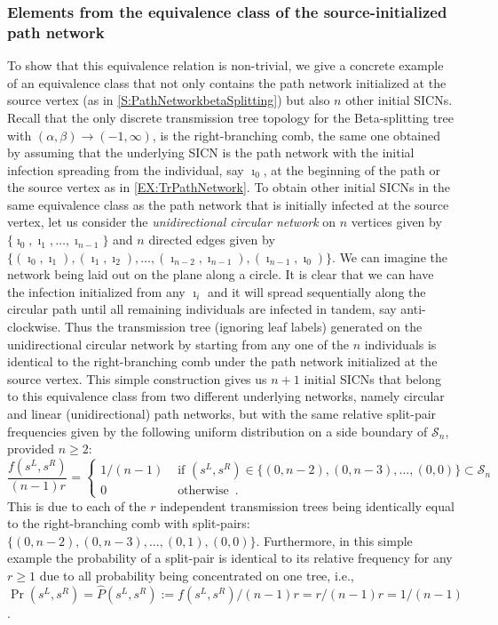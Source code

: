 \documentclass[review]{elsarticle}
\numberwithin{equation}{section}
\let\orgautoref\autoref
\renewcommand{\autoref}
        {\def\equationautorefname{Eq.}%
         \def\figureautorefname{Fig.}%
         \def\subfigureautorefname{Fig.}%
         \def\sectionautorefname{Sect.}%
         \def\subsectionautorefname{Sect.}%
         \def\subsubsectionautorefname{Sect.}%
         \def\Itemautorefname{item}%
         \def\tableautorefname{Table}%
         \def\propositionautorefname{Prop.}%
         \def\corollaryautorefname{Corollary}%
         \def\theoremautorefname{Theorem}%
         \def\remarkautorefname{Remark}%
         \def\lemmaautorefname{Lemma}%
         \def\proofofautorefname{Proof}%
         \def\exampleautorefname{Example}%
         \orgautoref}
\begin{document}
\subsubsection{Elements from the equivalence class of the source-initialized path network}\label{S:UnidirectionalCircularNetwork}
To show that this equivalence relation is non-trivial, we give a concrete example of an equivalence class that not only contains the path network initialized at the source vertex (as in \autoref{S:PathNetworkbetaSplitting}) but also $n$ other initial SICNs.
Recall that the only discrete transmission tree topology for the Beta-splitting tree with $(\alpha,\beta) \to (-1,\infty)$, 
is the right-branching comb, the same one obtained by assuming that the underlying SICN is the path network 
with the initial infection spreading from the individual, say $\imath_{0}$, at the beginning of the path or the source vertex as in \autoref{EX:TrPathNetwork}.   
To obtain other initial SICNs in the same equivalence class as the path network that is initially infected at the source vertex, let us consider the {\em unidirectional circular network} on $n$ vertices given by $\{\imath_0,\imath_1,\ldots,\imath_{n-1}\}$ and $n$ directed edges given by $\{(\imath_0,\imath_1), (\imath_1,\imath_2), \ldots, (\imath_{n-2},\imath_{n-1}), (\imath_{n-1},\imath_0)\}$.  We can imagine the network being laid out on the plane along a circle.    
It is clear that we can have the infection initialized from any $\imath_i$ and it will spread sequentially along the circular path until all remaining individuals are infected in tandem, say anti-clockwise.
Thus the transmission tree (ignoring leaf labels) generated on the unidirectional circular network by starting from any one of the $n$ individuals is identical to the right-branching comb under the path network initialized at the source vertex. 
This simple construction gives us $n+1$ initial SICNs that belong to this equivalence class from two different underlying networks, 
namely circular and linear (unidirectional) path networks, but with the same relative split-pair frequencies given by the following uniform distribution on a side boundary of $\mathcal{S}_n$, provided $n \geq 2$:
\[
\frac{f(s^L,s^R)}{(n-1)r} =
\begin{cases}
1/(n-1) & \text{ if } (s^L,s^R) \in \{(0,n-2),(0,n-3),\ldots,(0,0)\} \subset \mathcal{S}_n\\
0 & \text{ otherwise} \enspace.
\end{cases}
\] 
This is due to each of the $r$ independent transmission trees being identically equal to the right-branching comb 
with split-pairs: $\{(0,n-2),(0,n-3),\ldots,(0,1),(0,0)\}$.  
Furthermore, in this simple example the probability of a split-pair is identical to its relative frequency for any $r\geq 1$ due to all probability being concentrated on one tree, i.e., $\Pr(s^L,s^R)=\hat{P}(s^L,s^R):=f(s^L,s^R)/(n-1)r=r/(n-1)r=1/(n-1)$.
\end{document}
